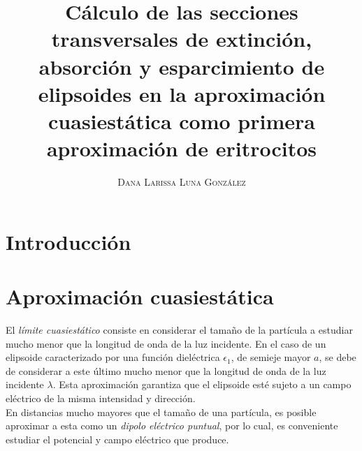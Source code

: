 \documentclass[paper=letter, fontsize=12pt,]{article}
\title{\vspace{-15mm}\fontsize{20pt}{10pt}\selectfont\textbf{Cálculo de las secciones transversales de extinción, absorción y esparcimiento de elipsoides en la aproximación cuasiestática como primera aproximación de eritrocitos }} %
\author{
\large
{\textsc{ Dana Larissa Luna González}}\\[2mm]}
\date{}
\begin{document}
\maketitle %
\thispagestyle{fancy} %


\section{Introducción}



\section{Aproximación cuasiestática}

El \textit{límite cuasiestático} consiste en considerar el tamaño de la partícula a estudiar mucho menor que la longitud de onda de la luz incidente. En el caso de un elipsoide caracterizado por una función dieléctrica $\epsilon_1$, de semieje mayor $a$, se debe de considerar a este último mucho menor que la longitud de onda de la luz incidente $\lambda$. Esta aproximación garantiza que el elipsoide esté sujeto a un campo eléctrico de la misma intensidad y dirección. \cite{Miguel}\\


En distancias mucho mayores que el tamaño de una partícula, es posible aproximar a esta como un \textit{dipolo eléctrico puntual}, por lo cual, es conveniente estudiar el potencial y campo eléctrico que produce.\\
\end{document}
